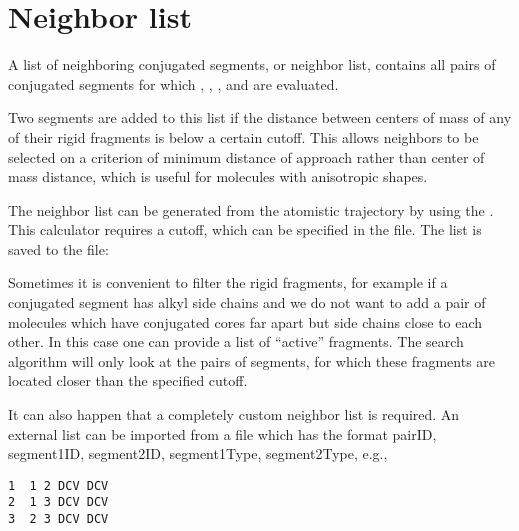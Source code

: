 \chapter{Neighbor list}
\label{sec:neighborlist}

A list of neighboring conjugated segments, or neighbor list, contains all pairs of conjugated segments for which , , , and  are evaluated.

Two segments are added to this list if the distance between centers of mass of any of their rigid fragments is below a certain cutoff. This allows neighbors to be selected on a criterion of minimum distance of approach rather than center of mass distance, which is useful for molecules with anisotropic shapes.

The neighbor list can be generated from the atomistic trajectory by using the  \calculator. This calculator requires a cutoff, which can be specified in the \xmloptions file. The list is saved to the \sqlstate file:

Sometimes it is convenient to filter the rigid fragments, for example if a conjugated segment has alkyl side chains and we do not want to add a pair of molecules which have conjugated cores far apart but side chains close to each other. In this case one can provide a list of ``active'' fragments. The search algorithm will only look at the pairs of segments, for which these fragments are located closer than the specified cutoff.

It can also happen that a completely custom neighbor list is required. An external list can be imported from a file which has the format pairID, segment1ID, segment2ID, segment1Type, segment2Type, e.g.,
\lstset{language=XML}
\begin{lstlisting}
1  1 2 DCV DCV  
2  1 3 DCV DCV     
3  2 3 DCV DCV 
\end{lstlisting}
